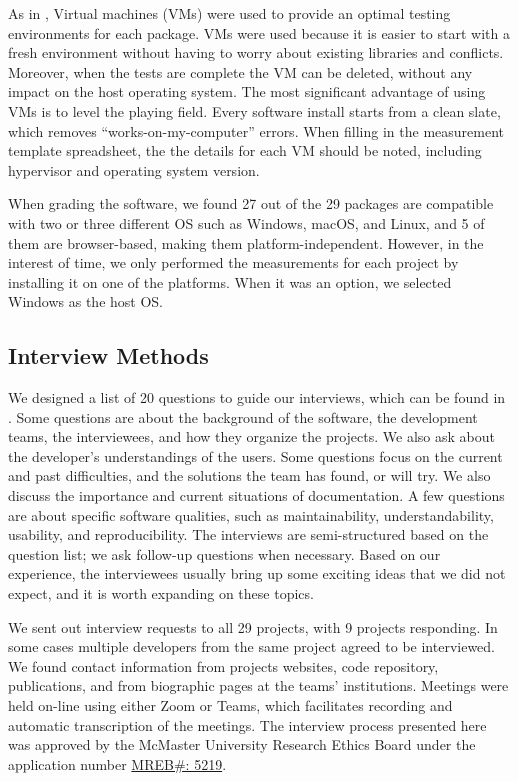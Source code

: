 \documentclass[final, 3p, times, authoryear]{elsarticle}
\begin{document}
As in \citet{SmithEtAl2016}, Virtual machines (VMs) were used to provide an
optimal testing environments for each package. VMs were used because it is
easier to start with a fresh environment without having to worry about existing
libraries and conflicts. Moreover, when the tests are complete the VM can be
deleted, without any impact on the host operating system. The most significant
advantage of using VMs is to level the playing field. Every software install
starts from a clean slate, which removes ``works-on-my-computer'' errors. When
filling in the measurement template spreadsheet, the the details for each VM
should be noted, including hypervisor and operating system version.

When grading the software, we found 27 out of the 29 packages are compatible
with two or three different OS such as Windows, macOS, and Linux, and 5 of them
are browser-based, making them platform-independent. However, in the interest of
time, we only performed the measurements for each project by installing it on
one of the platforms.  When it was an option, we selected Windows as the host
OS.

\subsection{Interview Methods} \label{sec_interview_methods}

We designed a list of 20 questions to guide our interviews, which can be found
in \citet{SmithEtAl2021}. Some questions are about the background of
the software, the development teams, the interviewees, and how they organize the
projects. We also ask about the developer's understandings of the users. Some
questions focus on the current and past difficulties, and the solutions the team
has found, or will try. We also discuss the importance and current situations of
documentation. A few questions are about specific software qualities, such as
maintainability, understandability, usability, and reproducibility. The
interviews are semi-structured based on the question list; we ask follow-up
questions when necessary. Based on our experience, the interviewees usually
bring up some exciting ideas that we did not expect, and it is worth expanding
on these topics.

We sent out interview requests to all 29 projects, with 9 projects responding.
In some cases multiple developers from the same project agreed to be
interviewed. We found contact information from projects websites, code
repository, publications, and from biographic pages at the teams’ institutions.
Meetings were held on-line using either Zoom or Teams, which facilitates
recording and automatic transcription of the meetings.  The interview process
presented here was approved by the McMaster University Research Ethics Board
under the application number 
\href{https://github.com/smiths/AIMSS/blob/master/StateOfPractice/MACREM/Application.pdf}
{MREB\#: 5219}.
\end{document}
